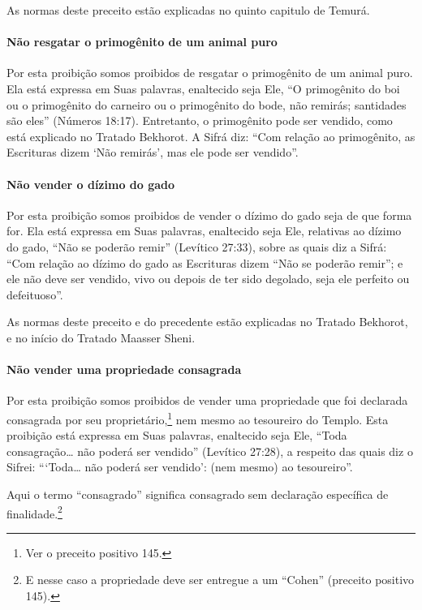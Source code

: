 As normas deste preceito estão explicadas no quinto capitulo de Temurá.

\paragraph{Não resgatar o primogênito de um animal puro}

Por esta proibição somos proibidos de resgatar o primogênito de um
animal puro. Ela está expressa em Suas palavras, enaltecido seja Ele,
``O primogênito do boi ou o primogênito do carneiro ou o primogênito do
bode, não remirás; santidades são eles'' (Números 18:17). Entretanto, o
primogênito pode ser vendido, como está explicado no Tratado Bekhorot. A
Sifrá diz: ``Com relação ao primogênito, as Escrituras dizem `Não
remirás', mas ele pode ser vendido''.

\paragraph{Não vender o dízimo do gado}

Por esta proibição somos proibidos de vender o dízimo do gado seja de
que forma for. Ela está expressa em Suas palavras, enaltecido seja Ele,
relativas ao dízimo do gado, ``Não se poderão remir'' (Levítico 27:33),
sobre as quais diz a Sifrá: ``Com relação ao dízimo do gado as
Escrituras dizem ``Não se poderão remir''; e ele não deve ser vendido,
vivo ou depois de ter sido degolado, seja ele perfeito ou defeituoso''.

As normas deste preceito e do precedente estão explicadas no Tratado
Bekhorot, e no início do Tratado Maasser Sheni.

\paragraph{Não vender uma propriedade consagrada}

Por esta proibição somos proibidos de vender uma propriedade que foi
declarada consagrada por seu proprietário,\footnote{Ver o preceito positivo 145.} nem
mesmo ao tesoureiro do Templo. Esta proibição está expressa em Suas
palavras, enaltecido seja Ele,
``Toda consagração\ldots{} não poderá ser vendido'' (Levítico 27:28), a
respeito das quais diz o Sifrei: ```Toda\ldots{} não poderá ser vendido':
(nem mesmo) ao tesoureiro''.

Aqui o termo ``consagrado'' significa consagrado sem declaração
específica de finalidade.\footnote{E nesse caso a propriedade deve ser entregue a um ``Cohen'' (preceito positivo 145).}

